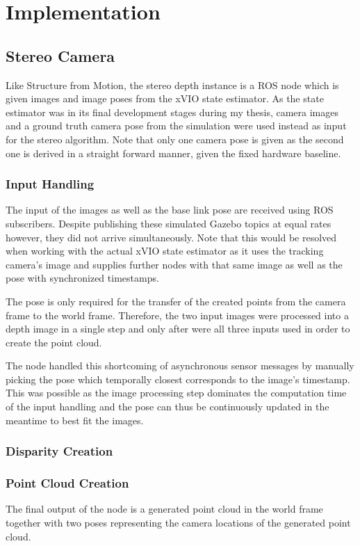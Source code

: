 \chapter{Implementation}\label{chapter:core_implementation}

\section{Stereo Camera}

Like Structure from Motion, the stereo depth instance is a ROS node which is given images and image poses from the xVIO state estimator. As the state estimator was in its final development stages during my thesis, camera images and a ground truth camera pose from the simulation were used instead as input for the stereo algorithm. Note that only one camera pose is given as the second one is derived in a straight forward manner, given the fixed hardware baseline.

\subsection{Input Handling}
The input of the images as well as the base link pose are received using ROS subscribers. Despite publishing these simulated Gazebo topics at equal rates however, they did not arrive simultaneously. Note that this would be resolved when working with the actual xVIO state estimator as it uses the tracking camera's image and supplies further nodes with that same image as well as the pose with synchronized timestamps.

The pose is only required for the transfer of the created points from the camera frame to the world frame. Therefore, the two input images were processed into a depth image in a single step and only after were all three inputs used in order to create the point cloud. 

The node handled this shortcoming of asynchronous sensor messages by manually picking the pose which temporally closest corresponds to the image's timestamp. This was possible as the image processing step dominates the computation time of the input handling and the pose can thus be continuously updated in the meantime to best fit the images.


\subsection{Disparity Creation}

\subsection{Point Cloud Creation}
The final output of the node is a generated point cloud in the world frame together with two poses representing the camera locations of the generated point cloud.

